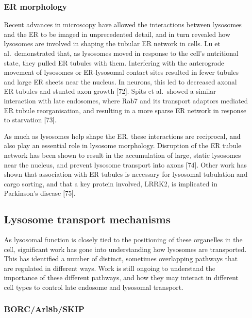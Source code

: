 \documentclass[
  12pt,
  a4paper,
]{book}
\begin{document}
\hypertarget{er-morphology}{%
\subsubsection{ER morphology}\label{er-morphology}}

Recent advances in microscopy have allowed the interactions between lysosomes and the ER to be imaged in unprecedented detail, and in turn revealed how lysosomes are involved in shaping the tubular ER network in cells. Lu et al.~demonstrated that, as lysosomes moved in response to the cell's nutritional state, they pulled ER tubules with them. Interfering with the anterograde movement of lysosomes or ER-lysosomal contact sites resulted in fewer tubules and large ER sheets near the nucleus. In neurons, this led to decreased axonal ER tubules and stunted axon growth {[}72{]}. Spits et al.~showed a similar interaction with late endosomes, where Rab7 and its transport adaptors mediated ER tubule reorganisation, and resulting in a more sparse ER network in response to starvation {[}73{]}.

As much as lysosomes help shape the ER, these interactions are reciprocal, and also play an essential role in lysosome morphology. Disruption of the ER tubule network has been shown to result in the accumulation of large, static lysosomes near the nucleus, and prevent lysosome transport into axons {[}74{]}. Other work has shown that association with ER tubules is necessary for lysosomal tubulation and cargo sorting, and that a key protein involved, LRRK2, is implicated in Parkinson's disease {[}75{]}.

\hypertarget{lysosome-transport-mechanisms}{%
\subsection{Lysosome transport mechanisms}\label{lysosome-transport-mechanisms}}

As lysosomal function is closely tied to the positioning of these organelles in the cell, significant work has gone into understanding how lysosomes are transported. This has identified a number of distinct, sometimes overlapping pathways that are regulated in different ways. Work is still ongoing to understand the importance of these different pathways, and how they may interact in different cell types to control late endosome and lysosomal transport.

\hypertarget{borcarl8bskip}{%
\subsubsection{BORC/Arl8b/SKIP}\label{borcarl8bskip}}
\end{document}
